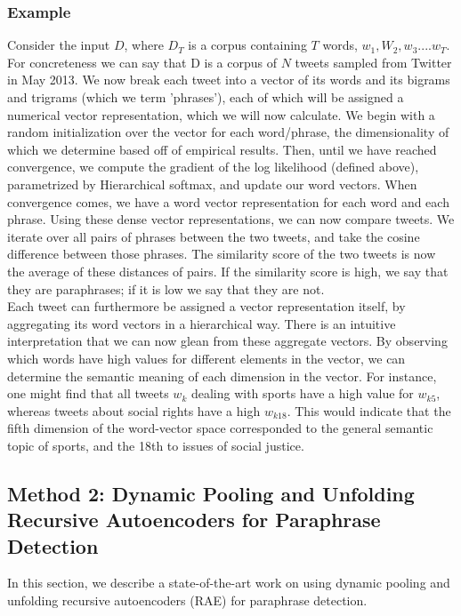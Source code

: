 \documentclass[conference]{IEEEtran}
\begin{document}
\subsubsection{Example}
Consider the input $D$, where $D_T$ is a corpus containing $T$ words, $w_1, W_2, w_3 .... w_T$. For concreteness we can say that D is a corpus of $N$ tweets sampled from Twitter in May 2013.  We now break each tweet into a vector of its words and its bigrams and trigrams (which we term 'phrases'), each of which will be assigned a numerical vector representation, which we will now calculate.  We begin with a random initialization over the vector for each word/phrase, the dimensionality of which we determine based off of empirical results. Then, until we have reached convergence, we compute the gradient of the log likelihood (defined above), parametrized by Hierarchical softmax, and update our word vectors. When convergence comes, we have a word vector representation for each word and each phrase.  
Using these dense vector representations, we can now compare tweets.  We iterate over all pairs of phrases between the two tweets, and take the cosine difference between those phrases.  The similarity score of the two tweets is now the average of these distances of pairs.  If the similarity score is high, we say that they are paraphrases; if it is low we say that they are not.\\

Each tweet can furthermore be assigned a vector representation itself, by aggregating its word vectors in a hierarchical way.  There is an intuitive interpretation that we can now glean from these aggregate vectors.  By observing which words have high values for different elements in the vector, we can determine the semantic meaning of each dimension in the vector. For instance, one might find that all tweets $w_k$ dealing with sports have a high value for $w_{k5}$, whereas tweets about social rights have a high $w_{k18}$. This would indicate that the fifth dimension of the word-vector space corresponded to the general semantic topic of sports, and the 18th to issues of social justice.\\



\subsection{Method 2: Dynamic Pooling and Unfolding Recursive Autoencoders for Paraphrase Detection}
In this section, we describe a state-of-the-art work \cite{richard} on using dynamic pooling and unfolding recursive autoencoders (RAE) for paraphrase detection.\\
\end{document}
